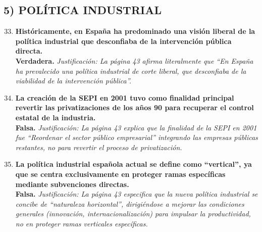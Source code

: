 \subsection*{5) POLÍTICA INDUSTRIAL}

\begin{enumerate}[label=\textbf{\arabic*.}]
    \setcounter{enumi}{32}

    \item \textbf{Históricamente, en España ha predominado una visión liberal de la política industrial que desconfiaba de la intervención pública directa.} \\
    \textbf{Verdadera.} \textit{Justificación: La página 43 afirma literalmente que ``En España ha prevalecido una política industrial de corte liberal, que desconfiaba de la viabilidad de la intervención pública''.}

    \item \textbf{La creación de la SEPI en 2001 tuvo como finalidad principal revertir las privatizaciones de los años 90 para recuperar el control estatal de la industria.} \\
    \textbf{Falsa.} \textit{Justificación: La página 43 explica que la finalidad de la SEPI en 2001 fue ``Reordenar el sector público empresarial'' integrando las empresas públicas restantes, no para revertir el proceso de privatización.}

    \item \textbf{La política industrial española actual se define como ``vertical'', ya que se centra exclusivamente en proteger ramas específicas mediante subvenciones directas.} \\
    \textbf{Falsa.} \textit{Justificación: La página 43 especifica que la nueva política industrial se concibe de ``naturaleza horizontal'', dirigiéndose a mejorar las condiciones generales (innovación, internacionalización) para impulsar la productividad, no en proteger ramas verticales específicas.}

\end{enumerate}
